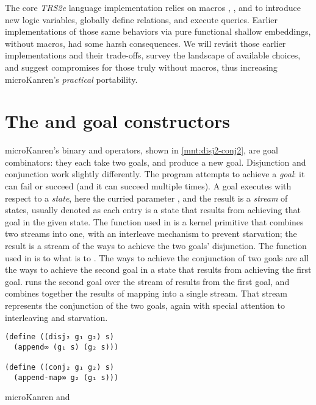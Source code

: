 \documentclass[sigplan,balance,pbalance,natbib=false]{acmart}
\begin{document}
The core \emph{TRS2e} language implementation relies on
macros , , and 
to introduce new logic variables, globally define relations, and
execute queries. Earlier implementations of those same behaviors via
pure functional shallow embeddings, without macros, had some harsh
consequences. We will revisit those earlier implementations and their
trade-offs, survey the landscape of available choices, and suggest
compromises for those truly without macros, thus increasing
microKanren's \emph{practical} portability.

\section{The  and  goal
  constructors}\label{sec:conde}

microKanren's binary  and 
operators, shown in \cref{mnt:disj2-conj2}, are goal combinators: they
each take two goals, and produce a new goal. Disjunction and
conjunction work slightly differently. The program attempts to achieve
a \emph{goal}: it can fail or succeed (and it can succeed multiple
times). A goal executes with respect to a \emph{state}, here the
curried parameter , and the result is a \emph{stream} of
states, usually denoted  as each entry is a state that
results from achieving that goal in the given state.
The
 function used in  is a kernel
primitive that combines two streams into one, with an interleave
mechanism to prevent starvation; the result is a stream of the ways to
achieve the two goals' disjunction. The 
function used in  is to
 what  is
to . The ways to achieve the conjunction of two
goals are all the ways to achieve the second goal in a state that
results from achieving the first goal.\@ {} runs
the second goal over the stream of results from the first goal, and
combines together the results of mapping into a single stream. That
stream represents the conjunction of the two goals, again with special
attention to interleaving and starvation.

\begin{listing}
  \begin{verbatim}
(define ((disj₂ g₁ g₂) s)
  (append∞ (g₁ s) (g₂ s)))

(define ((conj₂ g₁ g₂) s)
  (append-map∞ g₂ (g₁ s)))
  \end{verbatim}
  \caption{microKanren  and }\label{mnt:disj2-conj2}
\end{listing}
\end{document}
